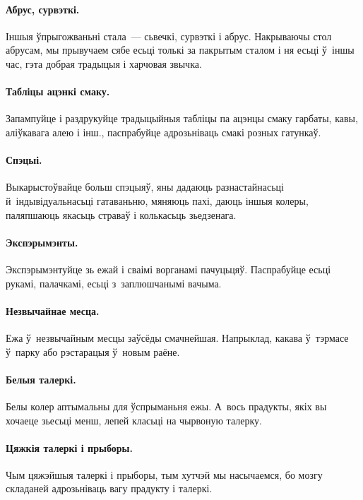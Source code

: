 \paragraph{Абрус, сурвэткі.}
Іншыя ўпрыгожваньні стала~--- сьвечкі, сурвэткі і абрус. Накрываючы стол абрусам, мы прывучаем сябе есьці толькі за пакрытым сталом і ня есьці ў~іншы час, гэта добрая традыцыя і харчовая звычка.

\paragraph{Табліцы ацэнкі смаку.}
Запампуйце і раздрукуйце традыцыйныя табліцы па ацэнцы смаку гарбаты, кавы, аліўкавага алею і інш., паспрабуйце адрозьніваць смакі розных гатункаў.


\paragraph{Спэцыі.}
Выкарыстоўвайце больш спэцыяў, яны дадаюць разнастайнасьці й~індывідуальнасьці гатаваньню, мяняюць пахі, даюць іншыя колеры, паляпшаюць якасьць страваў і колькасьць зьедзенага.

\paragraph{Экспэрымэнты.}
Экспэрымэнтуйце зь ежай і сваімі ворганамі пачуцьцяў. Паспрабуйце есьці рукамі, палачкамі, есьці з~заплюшчанымі вачыма.

\paragraph{Незвычайнае месца.}
Ежа ў~незвычайным месцы заўсёды смачнейшая. Напрыклад, какава ў~тэрмасе ў~парку або рэстарацыя ў~новым раёне.

\paragraph{Белыя талеркі.}
Белы колер аптымальны для ўспрыманьня ежы. А~вось прадукты, якіх вы хочаеце зьесьці менш, лепей класьці на чырвоную талерку.

\paragraph{Цяжкія талеркі і прыборы.}
Чым цяжэйшыя талеркі і прыборы, тым хутчэй мы насычаемся, бо мозгу складаней адрозьніваць вагу прадукту і талеркі.

